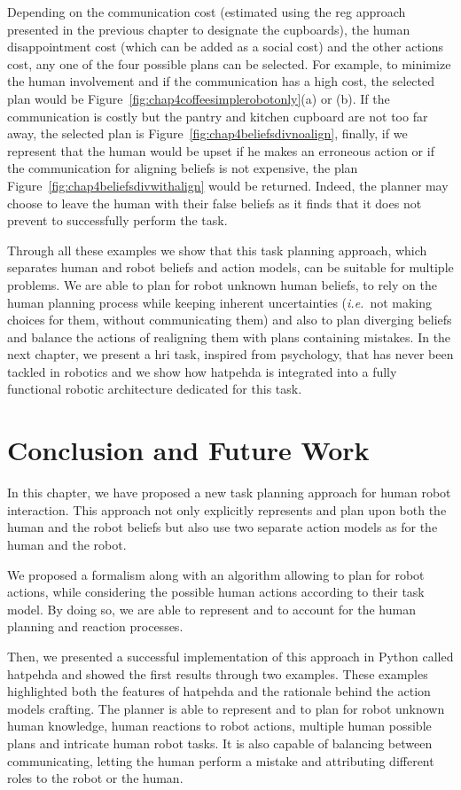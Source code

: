 \documentclass[a4paper,11pt,twoside]{StyleThese}
\begin{document}
Depending on the communication cost (estimated using the \acrshort{reg} approach presented in the previous chapter to designate the cupboards), the human disappointment cost (which can be added as a social cost) and the other actions cost, any one of the four possible plans can be selected. For example, to minimize the human involvement and if the communication has a high cost, the selected plan would be Figure~\ref{fig:chap4coffeesimplerobotonly}(a) or (b). If the communication is costly but the pantry and kitchen cupboard are not too far away, the selected plan is Figure~\ref{fig:chap4beliefsdivnoalign}, finally, if we represent that the human would be upset if he makes an erroneous action or if the communication for aligning beliefs is not expensive, the plan Figure~\ref{fig:chap4beliefsdivwithalign} would be returned.
Indeed, the planner may choose to leave the human with their false beliefs as it finds that it does not prevent to successfully perform the task. 

Through all these examples we show that this task planning approach, which separates human and robot beliefs and action models, can be suitable for multiple problems. We are able to plan for robot unknown human beliefs, to rely on the human planning process while keeping inherent uncertainties (\textit{i.e.}~not making choices for them, without communicating them) and also to plan diverging beliefs and balance the actions of realigning them with plans containing mistakes. In the next chapter, we present a \acrshort{hri} task, inspired from psychology, that has never been tackled in robotics and we show how \acrshort{hatpehda} is integrated into a fully functional robotic architecture dedicated for this task.

\section{Conclusion and Future Work}
In this chapter, we have proposed a new task planning approach for human robot interaction. This approach not only explicitly represents and plan upon both the human and the robot beliefs but also use two separate action models as  for the human and the robot.

We proposed a formalism along with an algorithm allowing to plan for robot actions, while considering the possible human actions according to their task model. By doing so, we are able to represent and to account for the human planning and reaction processes.

Then, we presented a successful implementation of this approach in Python called \acrfull{hatpehda} and showed the first results through two examples. These examples highlighted both the features of \acrshort{hatpehda} and the rationale behind the action models crafting. The planner is able to represent and to plan for robot unknown human knowledge, human reactions to robot actions, multiple human possible plans and intricate human robot tasks. It is also capable of balancing between communicating, letting the human perform a mistake and attributing different roles to the robot or the human.
\end{document}
